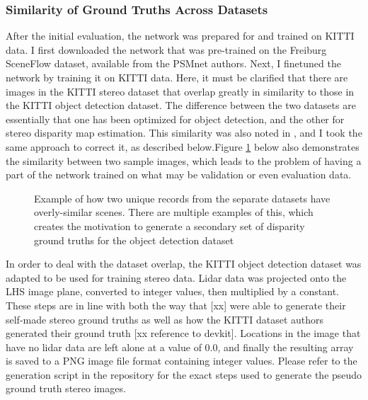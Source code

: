 \subsubsection{Similarity of Ground Truths Across Datasets}
After the initial evaluation, the network was prepared for and trained on KITTI data. I first downloaded the network that was pre-trained on the Freiburg SceneFlow dataset, available from the PSMnet authors. Next, I finetuned the network by training it on KITTI data. Here, it must be clarified that there are images in the KITTI stereo dataset that overlap greatly in similarity to those in the KITTI object detection dataset. The difference between the two datasets are essentially that one has been optimized for object detection, and the other for stereo disparity map estimation. This similarity was also noted in \cite{wang_pseudo-lidar_2019}, and I took the same approach to correct it, as described below.Figure \ref{similarity_stereo_objdet} below also demonstrates the similarity between two sample images, which leads to the problem of having a part of the network trained on what may be validation or even evaluation data.

\begin{figure}[H]
    \centering
    \caption{Example of how two unique records from the separate datasets have overly-similar scenes. There are multiple examples of this, which creates the motivation to generate a secondary set of disparity ground truths for the object detection dataset}
    \label{similarity_stereo_objdet}
\end{figure}

In order to deal with the dataset overlap, the KITTI object detection dataset was adapted to be used for training stereo data. Lidar data was projected onto the LHS image plane, converted to integer values, then multiplied by a constant. These steps are in line with both the way that [xx] were able to generate their self-made stereo ground truths as well as how the KITTI dataset authors generated their ground truth [xx reference to devkit]. Locations in the image that have no lidar data are left alone at a value of 0.0, and finally the resulting array is saved to a PNG image file format containing integer values. Please refer to the generation script in the repository for the exact steps used to generate the pseudo ground truth stereo images.

